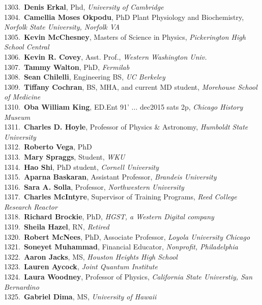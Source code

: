 1303.~{\bf Denis Erkal}, Phd, {\sl University of Cambridge} \\
1304.~{\bf Camellia Moses Okpodu}, PhD Plant Physiology and Biochemistry, {\sl Norfolk State University, Norfolk VA} \\
1305.~{\bf Kevin McChesney}, Masters of Science in Physics, {\sl Pickerington High School Central} \\
1306.~{\bf Kevin R. Covey}, Asst. Prof., {\sl Western Washington Univ.} \\
1307.~{\bf Tammy Walton}, PhD, {\sl Fermilab} \\
1308.~{\bf Sean Chilelli}, Engineering BS, {\sl UC Berkeley} \\
1309.~{\bf Tiffany Cochran}, BS, MHA, and current MD student, {\sl Morehouse School of Medicine} \\
1310.~{\bf Oba William King}, ED.Ent  91' ... dec2015 sats 2p, {\sl Chicago History Museum } \\
1311.~{\bf Charles D. Hoyle}, Professor of Physics \& Astronomy, {\sl Humboldt State University} \\
1312.~{\bf Roberto Vega}, PhD \\
1313.~{\bf Mary Spraggs}, Student, {\sl WKU} \\
1314.~{\bf Hao Shi}, PhD student, {\sl Cornell University} \\
1315.~{\bf Aparna Baskaran}, Assistant Professor, {\sl Brandeis University} \\
1316.~{\bf Sara A. Solla}, Professor, {\sl Northwestern University} \\
1317.~{\bf Charles McIntyre}, Supervisor of Training Programs, {\sl Reed College Research Reactor} \\
1318.~{\bf Richard Brockie}, PhD, {\sl HGST, a Western Digital company} \\
1319.~{\bf Sheila Hazel}, RN, {\sl Retired} \\
1320.~{\bf Robert McNees}, PhD, Associate Professor, {\sl Loyola University Chicago} \\
1321.~{\bf Soneyet Muhammad}, Financial Educator, {\sl Nonprofit, Philadelphia} \\
1322.~{\bf Aaron Jacks}, MS, {\sl Houston Heights High School} \\
1323.~{\bf Lauren Aycock}, {\sl Joint Quantum Institute} \\
1324.~{\bf Laura Woodney}, Professor of Physics, {\sl California State Universtiy, San Bernardino} \\
1325.~{\bf Gabriel Dima}, MS, {\sl University of Hawaii} \\
